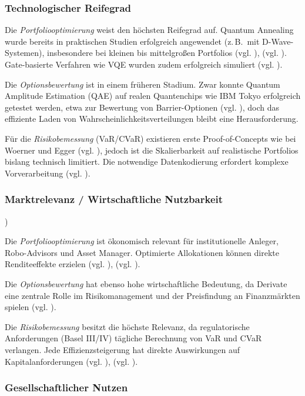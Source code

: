 \subsubsection*{Technologischer Reifegrad}

Die \textit{Portfoliooptimierung} weist den höchsten Reifegrad auf. Quantum Annealing wurde bereits in praktischen Studien erfolgreich angewendet (z.\,B.\ mit D-Wave-Systemen), insbesondere bei kleinen bis mittelgroßen Portfolios (vgl. \cite{rosenberg_finding_2016}), (vgl. \cite{mugel_dynamic_2022}). Gate-basierte Verfahren wie VQE wurden zudem erfolgreich simuliert (vgl. \cite{egger_quantum_2020}).

Die \textit{Optionsbewertung} ist in einem früheren Stadium. Zwar konnte Quantum Amplitude Estimation (QAE) auf realen Quantenchips wie IBM Tokyo erfolgreich getestet werden, etwa zur Bewertung von Barrier-Optionen (vgl. \cite{stamatopoulos_option_2020}), doch das effiziente Laden von Wahrscheinlichkeitsverteilungen bleibt eine Herausforderung.

Für die \textit{Risikobemessung} (VaR/CVaR) existieren erste Proof-of-Concepts wie bei Woerner und Egger (vgl. \cite{orus_quantum_2019}), jedoch ist die Skalierbarkeit auf realistische Portfolios bislang technisch limitiert. Die notwendige Datenkodierung erfordert komplexe Vorverarbeitung (vgl. \cite{zoufal_quantum_2019}).

\subsubsection*{Marktrelevanz / Wirtschaftliche Nutzbarkeit})

Die \textit{Portfoliooptimierung} ist ökonomisch relevant für institutionelle Anleger, Robo-Advisors und Asset Manager. Optimierte Allokationen können direkte Renditeeffekte erzielen (vgl. \cite{sakuler_real-world_2025}), (vgl. \cite{mugel_dynamic_2022}).

Die \textit{Optionsbewertung} hat ebenso hohe wirtschaftliche Bedeutung, da Derivate eine zentrale Rolle im Risikomanagement und der Preisfindung an Finanzmärkten spielen (vgl. \cite{stamatopoulos_option_2020}).

Die \textit{Risikobemessung} besitzt die höchste Relevanz, da regulatorische Anforderungen (Basel III/IV) tägliche Berechnung von VaR und CVaR verlangen. Jede Effizienzsteigerung hat direkte Auswirkungen auf Kapitalanforderungen (vgl. \cite{orus_quantum_2019}), (vgl. \cite{bouland_prospects_2020}).

\subsubsection*{Gesellschaftlicher Nutzen}

